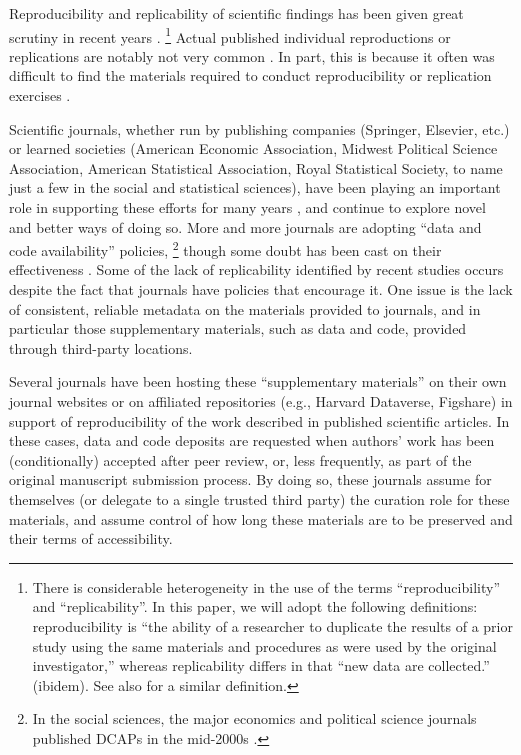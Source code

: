 Reproducibility and replicability of scientific findings has been given great scrutiny in recent years \parencite{CamererScience2016,Collaboration2015-ev,Klein2014,FanelliPNAS2018}.%
\footnote{There is considerable heterogeneity in the use of the terms
	``reproducibility'' and ``replicability''. In this paper, we will adopt
	the following definitions: reproducibility is ``the ability of a
	researcher to duplicate the results of a prior study using the same
	materials and procedures as were used by the original investigator,''
	\parencite{Bollen2015} whereas replicability
	differs in that ``new data are collected.'' (ibidem). See also \cite{NationalAcademiesofSciencesEngineeringandMedicine2019} for a similar definition.}
%
Actual published individual reproductions or replications are notably not very common \parencite[in economics, see][]{BellMiller2013b,Duvendack2017}. In part, this is because it often was difficult to find the materials required to conduct reproducibility or replication exercises \parencite{Dewald1986,McCullough2006,McCullough03}.  

Scientific journals, whether run by publishing companies (Springer, Elsevier, etc.) or learned societies (American Economic Association, Midwest Political Science Association, American Statistical Association, Royal Statistical Society, to name just a few in the social and statistical sciences), have been playing an important role in supporting these efforts for many years \parencite{stodden_enhancing_2016}, and continue to explore novel and better ways of doing so. More and more journals are adopting ``data and code availability'' policies,%
\footnote{In the social sciences, the major economics and political science journals published \acp{DCAP} in the mid-2000s \parencite{American_Economic_Association2008-wayback,nicholaseubankThePoliticalMethodologist2014}.}
though some doubt has been cast on their effectiveness \parencite{stodden_toward_2013,Stoddenempiricalanalysisjournal2018,Hoeffler2017,ChangAm.Econ.Rev.2017}. Some of the lack of replicability identified by recent studies \parencite{Hoeffler2017a,Chang2017,ChangLi2015,CamererEvaluatingreplicabilitylaboratory2016,Stoddenempiricalanalysisjournal2018}  occurs despite the fact that journals have  policies that encourage it. One issue is the lack of consistent, reliable metadata on the materials provided to journals, and in particular those supplementary materials, such as data and code, provided through third-party locations.

Several journals have been hosting these ``supplementary materials'' on their own journal websites or on affiliated repositories (e.g., Harvard Dataverse, Figshare) in support of reproducibility of the work described in published scientific articles. In these cases, data and code deposits are requested when authors' work has been (conditionally) accepted after peer review, or, less frequently, as part of the original manuscript submission process. By doing so, these journals assume for themselves (or delegate to a single trusted third party) the curation role for these materials, and assume control of how long these materials are to be preserved and their terms of accessibility.

